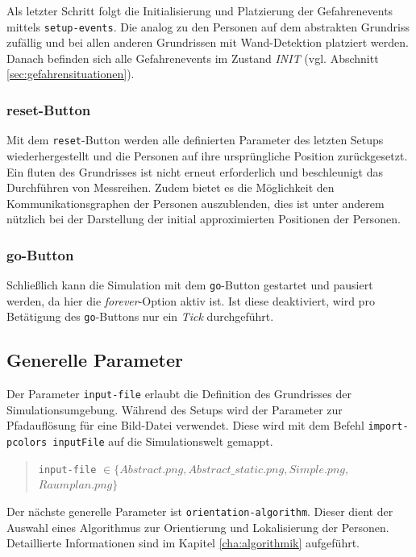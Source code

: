 Als letzter Schritt folgt die Initialisierung und Platzierung der Gefahrenevents  mittels \verb|setup-events|. Die analog zu den Personen auf dem abstrakten Grundriss zufällig und bei allen anderen Grundrissen mit Wand-Detektion platziert werden. Danach befinden sich alle Gefahrenevents im Zustand \emph{INIT} (vgl. Abschnitt \ref{sec:gefahrensituationen}).
 
\subsubsection*{reset-Button}

Mit dem \verb|reset|-Button werden alle definierten Parameter des letzten Setups wiederhergestellt und die Personen auf ihre ursprüngliche Position zurückgesetzt.
Ein fluten des Grundrisses ist nicht erneut erforderlich und beschleunigt das Durchführen von Messreihen.
Zudem bietet es die Möglichkeit den Kommunikationsgraphen der Personen auszublenden, dies ist unter anderem nützlich bei der Darstellung der initial approximierten Positionen der Personen.

\subsubsection*{go-Button}

Schließlich kann die Simulation mit dem \verb|go|-Button gestartet und pausiert werden, da hier die \emph{forever}-Option aktiv ist. Ist diese deaktiviert, wird pro Betätigung des \verb|go|-Buttons nur ein \emph{Tick} durchgeführt.

\subsection{Generelle Parameter}
\label{sec:gui_general}

Der Parameter \verb|input-file| erlaubt die Definition des Grundrisses der Simulationsumgebung. Während des Setups wird der Parameter zur Pfadauflösung für eine Bild-Datei verwendet. Diese wird mit dem Befehl \verb|import-pcolors inputFile| auf die Simulationswelt gemappt.

\begin{quote}
\verb|input-file| $\in \{Abstract.png, Abstract\_static.png, Simple.png,$ \\\hspace*{2.6cm}$Raumplan.png\}$
\end{quote}

Der nächste generelle Parameter ist \verb|orientation-algorithm|. Dieser dient der Auswahl eines Algorithmus zur Orientierung und Lokalisierung der Personen. Detaillierte Informationen sind im Kapitel \ref{cha:algorithmik} aufgeführt.

